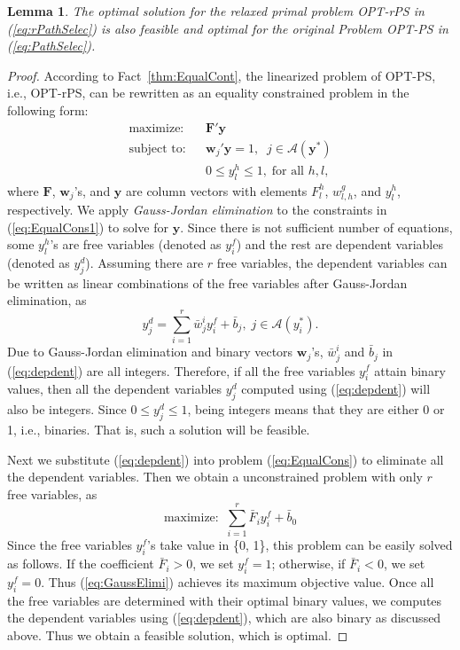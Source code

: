 \documentclass[12pt,onecolumn,draftclsnofoot]{IEEEtran} %
\newtheorem{lemma}{Lemma}
\begin{document}
\smallskip
\begin{lemma} \label{lemma:1}
The optimal solution for the relaxed primal problem OPT-rPS in (\ref{eq:rPathSelec}) is also feasible and optimal for the original Problem OPT-PS in (\ref{eq:PathSelec}).
\end{lemma}
%
\begin{proof}
According to Fact~\ref{thm:EqualCont}, the linearized problem of OPT-PS, i.e., OPT-rPS, can be rewritten as an equality constrained problem in the following form:
\begin{eqnarray}
	\mbox{maximize:} && \mathbf{F}'\mathbf{y} \label{eq:EqualCons} \\
	\mbox{subject to:} && \mathbf{w}_j' \mathbf{y}=1, \;\; j \in
     \mathcal{A}(\mathbf{y}^{\ast}) \label{eq:EqualCons1} \\
     && 0 \leq y_l^h \leq 1, \; \mbox{for all } h,l,  \nonumber
\end{eqnarray}
where $\mathbf{F}$, $\mathbf{w}_j$'s, and $\mathbf{y}$ are column vectors with elements $F_l^h$, $w_{l,h}^g$, and $y_l^h$, respectively.  We apply {\em Gauss-Jordan elimination} to the constraints in (\ref{eq:EqualCons1}) to solve for $\mathbf{y}$. Since there is not sufficient number of equations, some $y_l^h$'s are free variables (denoted as $y_i^f$) and the rest are dependent variables (denoted as $y_j^d$). Assuming there are $r$ free variables, the dependent variables can be written as linear combinations of the free variables after Gauss-Jordan elimination, as 
\begin{equation}\label{eq:depdent}
  y_j^d = \sum_{i=1}^r \bar{w}_j^i y_i^f + \bar{b}_j, 
          \; j \in \mathcal{A}(y_i^{\ast}).
\end{equation}
Due to Gauss-Jordan elimination and binary vectors $\mathbf{w}_j$'s, $\bar{w}_j^i$ and $\bar{b}_j$ in (\ref{eq:depdent}) are all integers.  Therefore, if all the free variables $y_i^f$ attain binary values, then all the dependent variables $y_j^d$ computed using (\ref{eq:depdent}) will also be integers.  Since $0 \leq y_j^d \leq 1$, being integers means that they are either 0 or 1, i.e., binaries. That is, such a solution will be feasible. 

Next we substitute (\ref{eq:depdent}) into problem (\ref{eq:EqualCons}) to eliminate all the dependent variables.   Then we obtain a unconstrained problem with only $r$ free variables, as
\begin{equation}
  \mbox{maximize:} \;\; \sum_{i=1}^r \bar{F}_i y_i^f + \bar{b}_0 
	\label{eq:GaussElimi}
\end{equation}
Since the free variables $y_i^f$'s take value in \{0, 1\}, this problem can be easily solved as follows. If the coefficient $\bar{F}_i > 0$, we set $y_i^f=1$; otherwise, if $\bar{F}_i < 0$, we set $y_i^f=0$.  Thus (\ref{eq:GaussElimi}) achieves its maximum objective value.  Once all the free variables are determined with their optimal binary values, we computes the dependent variables using (\ref{eq:depdent}), which are also binary as discussed above.  Thus we obtain a feasible solution, which is optimal. 
\end{proof}
\end{document}
